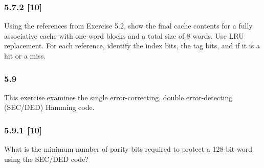 \documentclass[fleqn]{article}
\begin{document}
\subsubsection*{5.7.2 [10] \textrangle} Using the references from Exercise 5.2, show the final cache contents for a fully associative cache with one-word blocks and a total size of 8 words. Use LRU replacement. For each reference, identify the index bits, the tag bits, and if it is a hit or a miss.

\subsubsection*{5.9} This exercise examines the single error-correcting, double error-detecting (SEC/DED) Hamming code.
\subsubsection*{5.9.1 [10] \textrangle} What is the minimum number of parity bits required to protect a 128-bit word using the SEC/DED code?
\end{document}
